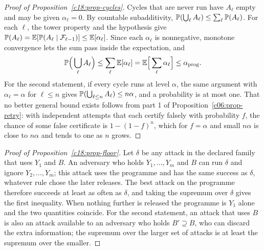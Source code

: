 \begin{proof}[Proof of Proposition~\ref{c18:prop-cycles}]
Cycles that are never run have $A_\ell$ empty and may be given $\alpha_\ell=0$.
By countable subadditivity, $\mathbb{P}(\bigcup_\ell A_\ell)\le\sum_\ell\mathbb{P}(A_\ell)$. For each $\ell$, the tower property and the
hypothesis give $\mathbb{P}(A_\ell)=\mathbb{E}[\mathbb{P}(A_\ell\mid\mathcal F_{\ell-1})]\le\mathbb{E}[\alpha_\ell]$. Since each $\alpha_\ell$ is nonnegative, monotone
convergence lets the sum pass inside the expectation, and
\[\mathbb{P}\Big(\bigcup_\ell A_\ell\Big)\le\sum_\ell\mathbb{E}[\alpha_\ell]=\mathbb{E}\Big[\sum_\ell\alpha_\ell\Big]\le\alpha_{\rm prog}.\]
For the second statement, if every cycle runs at level $\alpha$, the same argument with $\alpha_\ell=\alpha$
for $\ell\le n$ gives $\mathbb{P}(\bigcup_{\ell\le n}A_\ell)\le n\alpha$, and a probability is at most one. That no better general
bound exists follows from part 1 of Proposition~\ref{c06:prop-retry}: with independent attempts that each
certify falsely with probability $f$, the chance of some false certificate is $1-(1-f)^n$, which
for $f=\alpha$ and small $n\alpha$ is close to $n\alpha$ and tends to one as $n$ grows.
\end{proof}

\begin{proof}[Proof of Proposition~\ref{c18:prop-floor}]
Let $\delta$ be any attack in the declared family that uses $Y_1$ and $B$. An
adversary who holds $Y_1,\dots,Y_m$ and $B$ can run $\delta$ and ignore $Y_2,\dots,Y_m$; this attack uses the
programme and has the same success as $\delta$, whatever rule chose the later releases. The best
attack on the programme therefore succeeds at least as often as $\delta$, and taking the supremum
over $\delta$ gives the first inequality. When nothing further is released the programme is $Y_1$ alone
and the two quantities coincide. For the second statement, an attack that uses $B$ is also an
attack available to an adversary who holds $B'\supseteq B$, who can discard the extra information;
the supremum over the larger set of attacks is at least the supremum over the smaller.
\end{proof}
